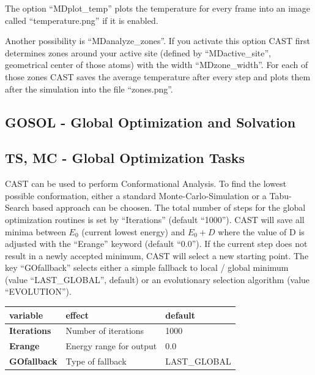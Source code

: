\documentclass[10pt,a4paper]{article} %
\newif\ifdevmode %
\begin{document}
The option ``MDplot\_temp'' plots the temperature for every frame into an image called ``temperature.png'' if it is enabled. 

Another possibility is ``MDanalyze\_zones''. If you activate this option CAST first determines zones around your active site (defined by ``MDactive\_site'', geometrical center of those atoms) with the width ``MDzone\_width''. For each of those zones CAST saves the average temperature after every step and plots them after the simulation into the file ``zones.png''.
	
	
	
	
	\fi
	
	\subsection{GOSOL - Global Optimization and Solvation}	
	\ifdevmode \colorbox{red}{write something here} \fi

	
	\subsection{TS, MC - Global Optimization Tasks}
	\ac{CAST} can be used to perform Conformational Analysis. To find the lowest possible conformation, either a standard Monte-Carlo-Simulation\supercite{mc_original, mmc_original} or a Tabu-Search\cite{tabusearch_original1, tabusearch_original2, tabusearch_original3} based approach can be choosen. The total number of steps for the global optimization routines is set by ``Iterations'' (default ``1000''). \ac{CAST} will save all minima between $E_0$ (current lowest energy) and $E_0 + D$ where the value of D is adjusted with the ``Erange'' keyword (default ``0.0'').
	If the current step does not result in a newly accepted minimum, \ac{CAST} will select a new starting point. The key ``GOfallback'' selects either a simple fallback to local / global minimum (value ``LAST\_GLOBAL'', default) or an evolutionary selection algorithm (value ``EVOLUTION'').
	
	\begin{tabularx}{\textwidth}{l|X|X}
	variable & effect & default \\
	\hline
	\textbf{Iterations} & Number of iterations & 1000 \\
	\textbf{Erange} & Energy range for output & 0.0 \\
		\textbf{GOfallback} & Type of fallback & LAST\_GLOBAL \\
	\end{tabularx}
	
\end{document}
